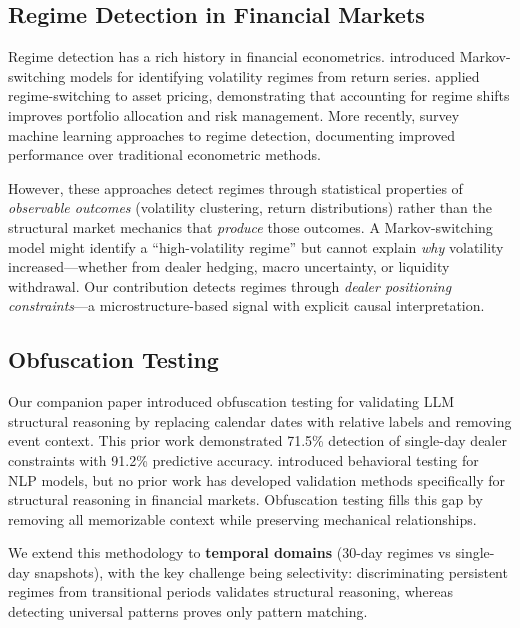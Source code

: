 \subsection{Regime Detection in Financial Markets}

Regime detection has a rich history in financial econometrics. \citet{hamilton1989new} introduced Markov-switching models for identifying volatility regimes from return series. \citet{ang2002regime} applied regime-switching to asset pricing, demonstrating that accounting for regime shifts improves portfolio allocation and risk management. More recently, \citet{nystrup2020regime} survey machine learning approaches to regime detection, documenting improved performance over traditional econometric methods.

However, these approaches detect regimes through statistical properties of \textit{observable outcomes} (volatility clustering, return distributions) rather than the structural market mechanics that \textit{produce} those outcomes. A Markov-switching model might identify a ``high-volatility regime'' but cannot explain \textit{why} volatility increased---whether from dealer hedging, macro uncertainty, or liquidity withdrawal. Our contribution detects regimes through \textit{dealer positioning constraints}---a microstructure-based signal with explicit causal interpretation.

\subsection{Obfuscation Testing}

Our companion paper \citep{regan2025obfuscation} introduced obfuscation testing for validating LLM structural reasoning by replacing calendar dates with relative labels and removing event context. This prior work demonstrated 71.5\% detection of single-day dealer constraints with 91.2\% predictive accuracy. \citet{ribeiro2020beyond} introduced behavioral testing for NLP models, but no prior work has developed validation methods specifically for structural reasoning in financial markets. Obfuscation testing fills this gap by removing all memorizable context while preserving mechanical relationships.

We extend this methodology to \textbf{temporal domains} (30-day regimes vs single-day snapshots), with the key challenge being selectivity: discriminating persistent regimes from transitional periods validates structural reasoning, whereas detecting universal patterns proves only pattern matching.

